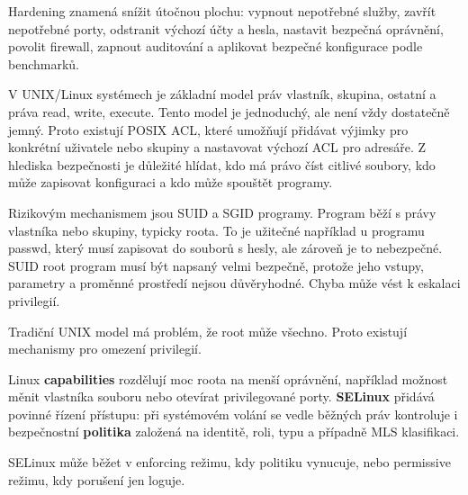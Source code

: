 \documentclass[11pt,a4paper]{article}
\begin{document}
Hardening znamená snížit útočnou plochu: vypnout nepotřebné služby, zavřít nepotřebné porty, odstranit výchozí účty a hesla, nastavit bezpečná oprávnění, povolit firewall, zapnout auditování a aplikovat bezpečné konfigurace podle benchmarků.

V UNIX/Linux systémech je základní model práv vlastník, skupina, ostatní a práva read, write, execute. Tento model je jednoduchý, ale není vždy dostatečně jemný. Proto existují POSIX ACL, které umožňují přidávat výjimky pro konkrétní uživatele nebo skupiny a nastavovat výchozí ACL pro adresáře. Z hlediska bezpečnosti je důležité hlídat, kdo má právo číst citlivé soubory, kdo může zapisovat konfiguraci a kdo může spouštět programy.

Rizikovým mechanismem jsou SUID a SGID programy. Program běží s právy vlastníka nebo skupiny, typicky roota. To je užitečné například u programu passwd, který musí zapisovat do souborů s hesly, ale zároveň je to nebezpečné. SUID root program musí být napsaný velmi bezpečně, protože jeho vstupy, parametry a proměnné prostředí nejsou důvěryhodné. Chyba může vést k eskalaci privilegií.

Tradiční UNIX model má problém, že root může všechno. Proto existují mechanismy pro omezení privilegií.

Linux \textbf{capabilities} rozdělují moc roota na menší oprávnění, například možnost měnit vlastníka souboru nebo otevírat privilegované porty. \textbf{SELinux} přidává povinné řízení přístupu: při systémovém volání se vedle běžných práv kontroluje i bezpečnostní \textbf{politika} založená na identitě, roli, typu a případně MLS klasifikaci.

SELinux může běžet v enforcing režimu, kdy politiku vynucuje, nebo permissive režimu, kdy porušení jen loguje.
\end{document}

